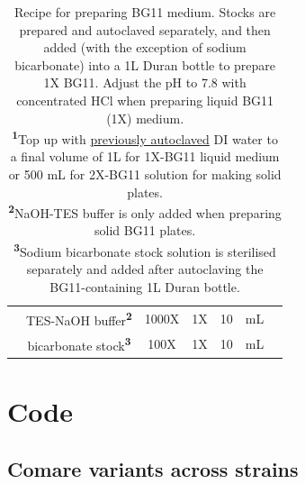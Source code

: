 \documentclass[12pt]{article}
\begin{document}
\begin{table}[H]
\begin{tabular}{c|ccccc|c}
                                                                                                     & TES-NaOH buffer\textsuperscript{\textbf{2}} & 1000X                                 & 1X                                      & 10                                   & mL             &  
    \\                                                                                                 
                                                                                                    & bicarbonate stock\textsuperscript{\textbf{3}}                                                            & 100X                                  & 1X                                      & 10                                   & mL             &                                                                                                                                      \\ \hline
                                                                                                     
                                                                                                     
    \end{tabular}
    \caption[Recipe for preparing BG11 medium]{Recipe for preparing BG11 medium. Stocks are prepared and autoclaved separately, and then added (with the exception of sodium bicarbonate) into a 1L Duran bottle to prepare 1X BG11. Adjust the pH to 7.8 with concentrated HCl when preparing liquid BG11 (1X) medium.\\ \textsuperscript{\textbf{1}}Top up with \ul{previously autoclaved} DI water to a final volume of 1L for 1X-BG11 liquid medium or 500 mL for 2X-BG11 solution for making solid plates.\\ \textsuperscript{\textbf{2}}NaOH-TES buffer is only added when preparing solid BG11 plates. \\ \textsuperscript{\textbf{3}}Sodium bicarbonate stock solution is sterilised separately and added after autoclaving the BG11-containing 1L Duran bottle.}
    \label{Tab:BG11rec}
    
\end{table}

\section{Code}


\subsection{Comare variants across strains}
\end{document}
